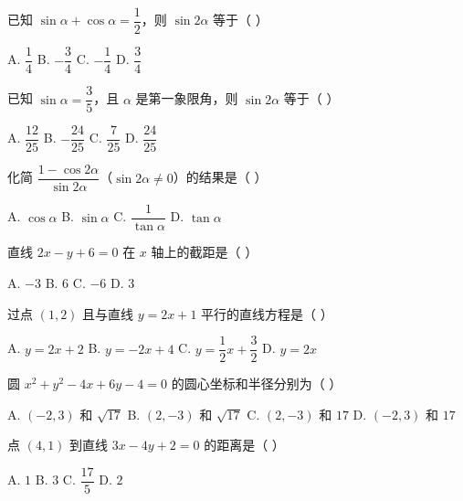 \documentclass[11pt, a4paper]{article}
\begin{document}
\begin{baitap}[8]
已知 $\sin\alpha + \cos\alpha = \dfrac{1}{2}$，则 $\sin 2\alpha$ 等于（ ）
\par\vspace{3pt}
\noindent A. $\dfrac{1}{4}$ \quad B. $-\dfrac{3}{4}$ \quad C. $-\dfrac{1}{4}$ \quad D. $\dfrac{3}{4}$
\end{baitap}

\begin{baitap}[9]
已知 $\sin\alpha = \dfrac{3}{5}$，且 $\alpha$ 是第一象限角，则 $\sin 2\alpha$ 等于（ ）
\par\vspace{3pt}
\noindent A. $\dfrac{12}{25}$ \quad B. $-\dfrac{24}{25}$ \quad C. $\dfrac{7}{25}$ \quad D. $\dfrac{24}{25}$
\end{baitap}

\begin{baitap}[10]
化简 $\dfrac{1 - \cos 2\alpha}{\sin 2\alpha}$（$\sin 2\alpha \ne 0$）的结果是（ ）
\par\vspace{3pt}
\noindent A. $\cos\alpha$ \quad B. $\sin\alpha$ \quad C. $\dfrac{1}{\tan\alpha}$ \quad D. $\tan\alpha$
\end{baitap}

\begin{baitap}[11]
直线 $2x - y + 6 = 0$ 在 $x$ 轴上的截距是（ ）
\par\vspace{3pt}
\noindent A. $-3$ \quad B. $6$ \quad C. $-6$ \quad D. $3$
\end{baitap}

\begin{baitap}[12]
过点 $(1, 2)$ 且与直线 $y = 2x + 1$ 平行的直线方程是（ ）
\par\vspace{3pt}
\noindent A. $y = 2x + 2$ \quad B. $y = -2x + 4$ \quad C. $y = \dfrac{1}{2}x + \dfrac{3}{2}$ \quad D. $y = 2x$
\end{baitap}

\begin{baitap}[13]
圆 $x^2 + y^2 - 4x + 6y - 4 = 0$ 的圆心坐标和半径分别为（ ）
\par\vspace{3pt}
\noindent A. $(-2, 3)$ 和 $\sqrt{17}$ \quad B. $(2, -3)$ 和 $\sqrt{17}$ \quad C. $(2, -3)$ 和 $17$ \quad D. $(-2, 3)$ 和 $17$
\end{baitap}

\begin{baitap}[14]
点 $(4, 1)$ 到直线 $3x - 4y + 2 = 0$ 的距离是（ ）
\par\vspace{3pt}
\noindent A. $1$ \quad B. $3$ \quad C. $\dfrac{17}{5}$ \quad D. $2$
\end{baitap}
\end{document}
